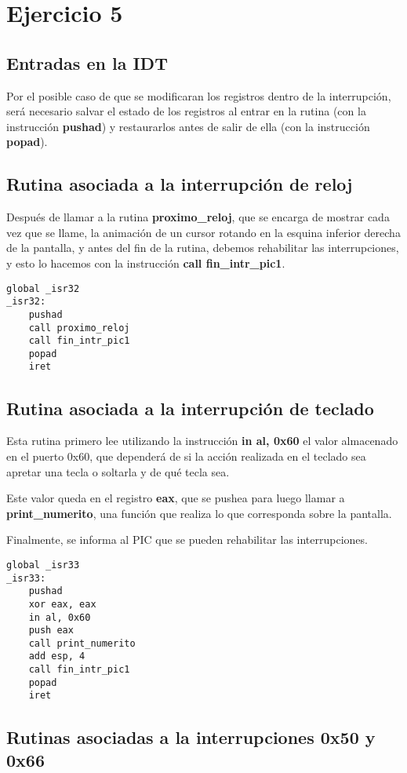\section{Ejercicio 5}
\par{}

\subsection*{Entradas en la IDT}
\par{Por el posible caso de que se modificaran los registros dentro de la interrupción, será necesario salvar el estado de los registros al entrar en la rutina (con la instrucción \textbf{pushad}) y restaurarlos antes de salir de ella (con
la instrucción \textbf{popad}).}


\subsection*{Rutina asociada a la interrupción de reloj}
\par{Después de llamar a la rutina \textbf{proximo\_reloj}, que se encarga de mostrar cada vez que se llame, la animación de un cursor rotando en la esquina inferior derecha de la pantalla, y antes del fin de la rutina, debemos rehabilitar las interrupciones, y esto lo hacemos con la instrucción \textbf{call fin\_intr\_pic1}.}
\begin{lstlisting}[language={[x86masm]Assembler}]
global _isr32
_isr32:
    pushad
    call proximo_reloj
    call fin_intr_pic1
    popad
    iret
\end{lstlisting}

\subsection*{Rutina asociada a la interrupción de teclado}
\par{Esta rutina primero lee utilizando la instrucción \textbf{in al, 0x60} el valor almacenado en el puerto 0x60, que dependerá de si la acción realizada en el teclado sea apretar una tecla o soltarla y de qué tecla sea.}
\par{Este valor queda en el registro \textbf{eax}, que se pushea para luego llamar a \textbf{print\_numerito}, una función que realiza lo que corresponda sobre la pantalla.}
\par{Finalmente, se informa al PIC que se pueden rehabilitar las interrupciones.}
\begin{lstlisting}[language={[x86masm]Assembler}]
global _isr33
_isr33:
    pushad
    xor eax, eax
    in al, 0x60
    push eax
    call print_numerito
    add esp, 4
    call fin_intr_pic1
    popad
    iret
\end{lstlisting}

\subsection*{Rutinas asociadas a la interrupciones 0x50 y 0x66}
\par{}


\clearpage